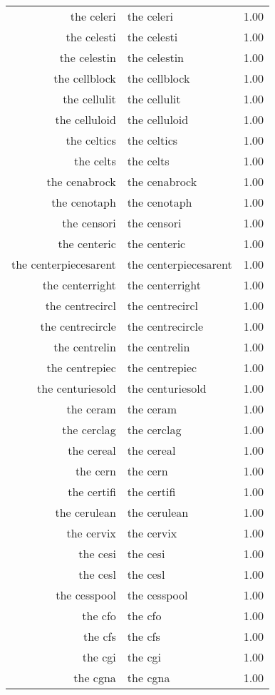 \begin{table}[ht]
\begin{tabular}{rlr}
  the celeri & the celeri & 1.00 \\ 
  the celesti & the celesti & 1.00 \\ 
  the celestin & the celestin & 1.00 \\ 
  the cellblock & the cellblock & 1.00 \\ 
  the cellulit & the cellulit & 1.00 \\ 
  the celluloid & the celluloid & 1.00 \\ 
  the celtics & the celtics & 1.00 \\ 
  the celts & the celts & 1.00 \\ 
  the cenabrock & the cenabrock & 1.00 \\ 
  the cenotaph & the cenotaph & 1.00 \\ 
  the censori & the censori & 1.00 \\ 
  the centeric & the centeric & 1.00 \\ 
  the centerpiecesarent & the centerpiecesarent & 1.00 \\ 
  the centerright & the centerright & 1.00 \\ 
  the centrecircl & the centrecircl & 1.00 \\ 
  the centrecircle & the centrecircle & 1.00 \\ 
  the centrelin & the centrelin & 1.00 \\ 
  the centrepiec & the centrepiec & 1.00 \\ 
  the centuriesold & the centuriesold & 1.00 \\ 
  the ceram & the ceram & 1.00 \\ 
  the cerclag & the cerclag & 1.00 \\ 
  the cereal & the cereal & 1.00 \\ 
  the cern & the cern & 1.00 \\ 
  the certifi & the certifi & 1.00 \\ 
  the cerulean & the cerulean & 1.00 \\ 
  the cervix & the cervix & 1.00 \\ 
  the cesi & the cesi & 1.00 \\ 
  the cesl & the cesl & 1.00 \\ 
  the cesspool & the cesspool & 1.00 \\ 
  the cfo & the cfo & 1.00 \\ 
  the cfs & the cfs & 1.00 \\ 
  the cgi & the cgi & 1.00 \\ 
  the cgna & the cgna & 1.00 \\ 

\end{tabular}
\end{table}
